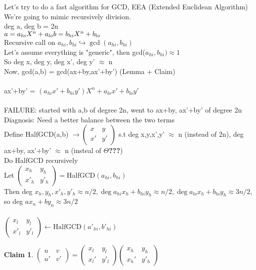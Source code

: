 \documentclass{article}
\newtheorem{claim}{Claim}
\theoremstyle{definition}
\theoremstyle{remark}
\begin{document}
Let's try to do a fast algorithm for GCD, EEA (Extended Euclidean Algorithm)\\
We're going to mimic recursively division.\\
deg a, deg b = 2n\\
$a = a_{hi}X^n + a_{lo}\\
b = b_{hi}X^n + b_{lo}$\\
Recursive call on $a_{hi},b_{hi}\hookrightarrow \gcd(a_{hi},b_{hi})$\\

Let's assume everything is "generic", then gcd($a_{hi},b_{hi}) \approx 1$\\
So deg x, deg y, deg x', deg y' $\approx$ n\\

Now, gcd(a,b) = gcd(ax+by,ax'+by') (Lemma + Claim)\\\\
ax'+by' = $(a_{hi}x'+b_{hi}y')X^n + a_{lo}x' + b_{lo}y'$\\\\
FAILURE: started with a,b of degree 2n, went to ax+by, ax'+by' of degree 2n\\

Diagnosis: Need a better balance between the two terms\\

Define HalfGCD(a,b) $\rightarrow \begin{pmatrix}
x & y\\x' & y'
\end{pmatrix}$ s.t deg x,y,x',y' $\approx$ n (instead of 2n), deg ax+by, ax'+by' $\approx$ n (insteal of $\Theta$\textbf{???})\\

Do HalfGCD recursively\\
Let $\begin{pmatrix}
x_h&y_h\\x'_h&y'_h
\end{pmatrix} = $HalfGCD$(a_{hi},b_{hi})$\\
Then deg $x_h,y_h,x'_h,y'_h \approx n/2, \deg a_{hi}x_h+b_{hi}y_h \approx n/2, \deg a_{lo} x_h + b_{lo} y_h \approx 3n/2$, so deg  $ax_n + by_n \approx 3n/2$\\\\
$\begin{pmatrix}
x_l&y_l\\x'_l&y'_l
\end{pmatrix} \leftarrow \text{HalfGCD}(a'_{hi},b'_{hi})$

\begin{claim}
	$\begin{pmatrix}
	u&v\\u'&v'
	\end{pmatrix}
	=
	\begin{pmatrix}
	x_l&y_l\\x_l'&y'_l
	\end{pmatrix}
	\begin{pmatrix}
	x_h&y_h\\x_h'&y'_h
	\end{pmatrix}$
\end{claim}
\end{document}
